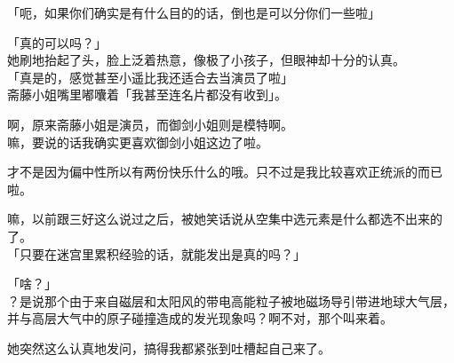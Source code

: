 「呃，如果你们确实是有什么目的的话，倒也是可以分你们一些啦」

「真的可以吗？」\\

她刷地抬起了头，脸上泛着热意，像极了小孩子，但眼神却十分的认真。\\

「真是的，感觉甚至小遥比我还适合去当演员了啦」\\

斋藤小姐嘴里嘟囔着「我甚至连名片都没有收到」。

啊，原来斋藤小姐是演员，而御剑小姐则是模特啊。\\

嘛，要说的话我确实更喜欢御剑小姐这边了啦。

才不是因为偏中性所以有两份快乐什么的哦。只不过是我比较喜欢正统派的而已啦。

嘛，以前跟三好这么说过之后，被她笑话说从空集中选元素是什么都选不出来的了。\\

「只要在迷宫里累积经验的话，就能发出是真的吗？」

「啥？」\\

？是说那个由于来自磁层和太阳风的带电高能粒子被地磁场导引带进地球大气层，并与高层大气中的原子碰撞造成的发光现象吗？啊不对，那个叫来着。

她突然这么认真地发问，搞得我都紧张到吐槽起自己来了。\\


